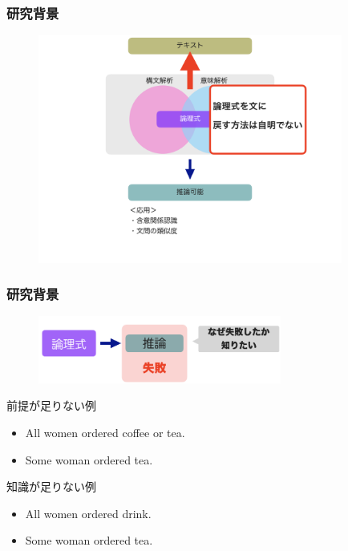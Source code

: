 \documentclass[dvipdfmx,cjk]{beamer}
\begin{document}
\begin{frame}
\frametitle{研究背景}
\begin{center}
\begin{figure}[h]
	\includegraphics[width=10cm]{backend2.png}
        \label{fig:backend2}
\end{figure}
\end{center}
\end{frame}

\begin{frame}
\frametitle{研究背景}
\begin{center}
\begin{figure}[h]
	\includegraphics[width=8cm]{backend4.png}
        \label{fig:backend4}
\end{figure}
\end{center}
\begin{block}{前提が足りない例}
  \begin{itemize}
    \item All women ordered coffee or tea.
    \item Some woman ordered tea.
  \end{itemize}
\end{block}
\begin{block}{知識が足りない例}
  \begin{itemize}
    \item All women ordered drink.
    \item Some woman ordered tea.
  \end{itemize}
\end{block}

\end{frame}
\end{document}
